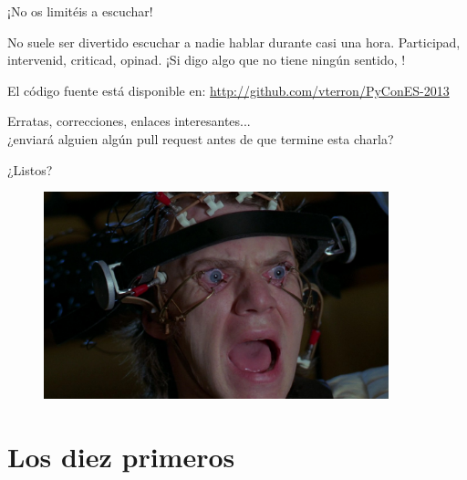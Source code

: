 \documentclass[14pt]{beamer}
\begin{document}
\begin{frame}{¡No os limitéis a escuchar!}
  \begin{center}
    No suele ser divertido escuchar a nadie hablar durante casi una
    hora. Participad, intervenid, criticad, opinad. ¡Si digo algo que
    no tiene ningún sentido, !
  \end{center}

  \begin{block}{\centering El código fuente está disponible en:}
    \centering \url{http://github.com/vterron/PyConES-2013}
  \end{block}

  \begin{center}
    \small Erratas, correcciones, enlaces interesantes...\\ ¿enviará
    alguien algún pull request antes de que termine esta charla?
  \end{center}
\end{frame}

\begin{frame}{}
  \begin{alertblock}{}
    \centering \Large ¿Listos?
  \end{alertblock}

  \begin{figure}
    \centering
    \includegraphics[height=6cm]{pics/a-clockwork-orange.jpg}
  \end{figure}
\end{frame}

\section{Los diez primeros}





\end{document}
